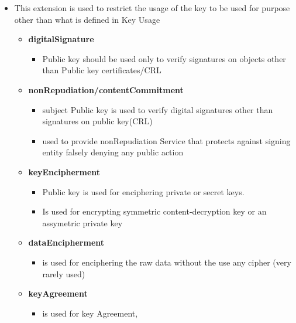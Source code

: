 \documentclass[12pt]{report}
\begin{document}
\begin{itemize}
\begin{itemize}
                    \item This extension is used to restrict the usage of the key to be used for purpose 
                        other than what is defined in Key Usage
                    \begin{itemize}
                        \item \textbf{digitalSignature}
                            \begin{itemize}
                                \item Public key should be used only to verify signatures on objects other than Public key certificates/CRL
                            \end{itemize}
                        \item \textbf{nonRepudiation/contentCommitment}
                            \begin{itemize}
                                \item subject Public key is used to verify digital signatures other than signatures on public key(CRL)
                                \item used to provide nonRepudiation Service that protects against signing entity falsely denying any public action
                            \end{itemize}
                        \item \textbf{keyEncipherment}
                            \begin{itemize}
                                \item Public key is used for enciphering private or secret keys.
                                \item Is used for encrypting symmetric content-decryption key or an assymetric private key
                            \end{itemize}
                        \item \textbf{dataEncipherment}
                            \begin{itemize}
                                \item is used for enciphering the raw data without the use any cipher  (very rarely used)
                            \end{itemize}
                        \item \textbf{keyAgreement}
                            \begin{itemize}
                                \item is used for key Agreement, 

\end{itemize}
\end{itemize}
\end{itemize}
\end{itemize}
\end{document}
